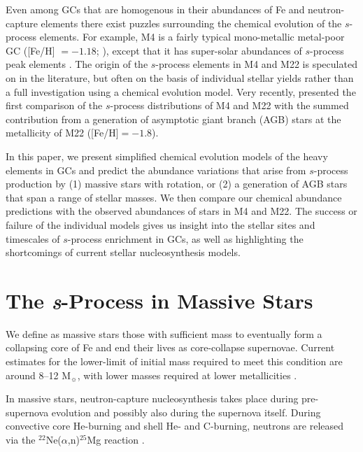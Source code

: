 Even among GCs that are homogenous in their abundances of Fe and neutron-capture elements there exist puzzles surrounding the chemical evolution of the $s$-process elements. For example, M4 is a fairly typical mono-metallic metal-poor GC ([Fe/H] $=-1.18$; \citealt{Carretta:2009di}), except that it has super-solar abundances of $s$-process peak elements \citep[e.g., Rb, Y, Zr, La, Ba, Pb;][]{Brown:1992dw,Ivans:1999hf}. The origin of the $s$-process elements in M4 and M22 is speculated on in the literature, but often on the basis of individual stellar yields \citep[e.g.,][]{Roederer:2011hw} rather than a full investigation using a chemical evolution model. Very recently, \citet{Straniero:2014jk} presented the first comparison of the $s$-process distributions of M4 and M22 with the summed contribution from a generation of asymptotic giant branch (AGB) stars at the metallicity of M22 ([Fe/H]$=-1.8$).

In this paper, we present simplified chemical evolution models of the heavy elements in GCs and predict the abundance variations that arise from $s$-process production by (1) massive stars with rotation, or (2) a generation of AGB stars that span a range of stellar masses. We then compare our chemical abundance predictions with the observed abundances of stars in M4 and M22. The success or failure of the individual models gives us insight into the stellar sites and timescales of $s$-process enrichment in GCs, as well as highlighting the shortcomings of current stellar nucleosynthesis models.

\section{The \textit{s}-Process in Massive Stars}\label{sec:sprocessmassivestars}
We define as massive stars those with sufficient mass to eventually form a collapsing core of Fe and end their lives as core-collapse supernovae. Current estimates for the lower-limit of initial mass required to meet this condition are around 8--12 M$_\sun$, with lower masses required at lower metallicities \citep{Langer:2012jy,Nomoto:2013js,Jones:2013iw}.

In massive stars, neutron-capture nucleosynthesis takes place during pre-supernova evolution and possibly also during the supernova itself. During convective core He-burning and shell He- and C-burning, neutrons are released via the $^{22}$Ne($\alpha$,n)$^{25}$Mg reaction \citep{Peters:1968bf,Raiteri:1992dn,Meyer:1994br,The:2007gb}.

